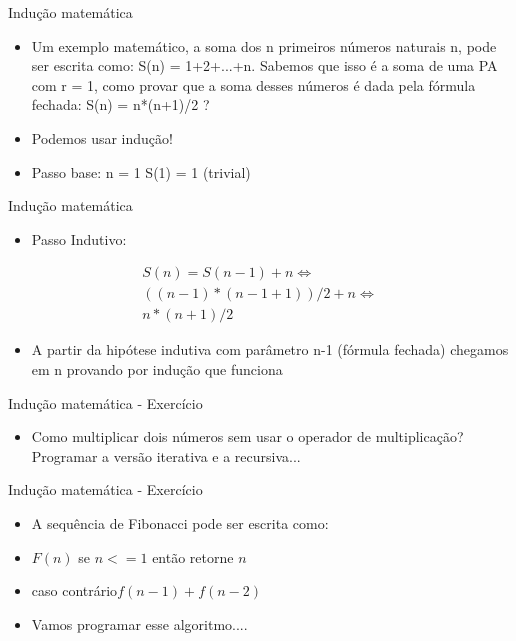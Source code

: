 \begin{frame}
	\begin{block}{Indução matemática}
		\begin{itemize}
			\item Um exemplo matemático, a soma dos n primeiros números naturais n, pode ser escrita como: S(n) = 1+2+...+n. Sabemos que isso é a soma de uma PA com r = 1, como provar que a soma desses números é dada pela fórmula fechada: S(n) = n*(n+1)/2 ?
			
			\item Podemos usar indução!
			
			\item Passo base: n = 1 S(1) = 1 (trivial)
		\end{itemize}
	\end{block}
\end{frame}

\begin{frame}
	\begin{block}{Indução matemática}
		\begin{itemize}
			\item Passo Indutivo: 
		\end{itemize}
		\begin{eqnarray}
				S(n) = S(n-1) + n \Leftrightarrow \\
				((n-1) *(n-1+1) )/2 + n \Leftrightarrow \\
				n*(n+1) / 2
		\end{eqnarray}
		\begin{itemize}
			\item A partir da hipótese indutiva com parâmetro n-1 (fórmula fechada) chegamos em n provando por indução que funciona
		\end{itemize}
	\end{block}
\end{frame}


\begin{frame}
	\begin{block}{Indução matemática - Exercício}
		\begin{itemize}
			\item Como multiplicar dois números sem usar o operador de multiplicação? Programar a versão iterativa e a recursiva...
		\end{itemize}
	\end{block}
\end{frame}

\begin{frame}
	\begin{block}{Indução matemática - Exercício}
		\begin{itemize}
			\item A sequência de Fibonacci pode ser escrita como:

			\item $F(n)$  se $n <= 1$ então retorne $n$
			\item caso contrário$f(n-1) + f(n-2)$
			
			\item Vamos programar esse algoritmo....
		\end{itemize}
	\end{block}
\end{frame}

